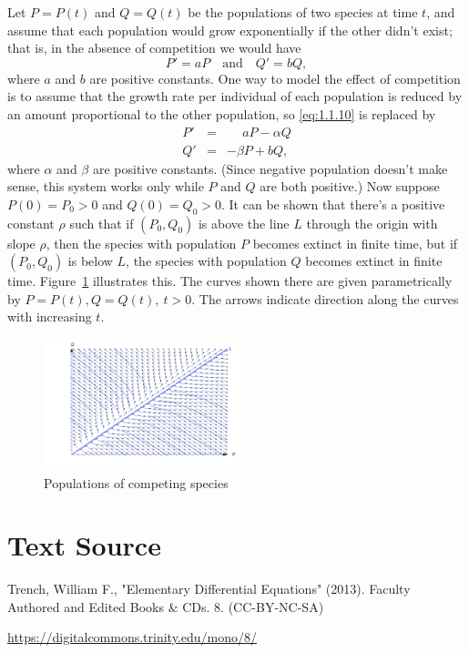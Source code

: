 \documentclass{ximera}
\begin{document}
Let $P=P(t)$ and $Q=Q(t)$ be the populations of two species at time
$t$, and assume that each population would grow exponentially if the
other didn't exist; that is, in the absence of competition we would
have
\begin{equation} \label{eq:1.1.10}
P'=aP \quad\text{and}\quad Q'=bQ,
\end{equation}
where $a$ and $b$ are positive constants. One way to model the effect
of competition is to assume that the growth rate per individual of
each population is reduced by an amount proportional to the other
population, so \eqref{eq:1.1.10} is replaced by
\begin{eqnarray*}
P'&=&\phantom{-}aP-\alpha Q\\
Q'&=&-\beta P+bQ,
\end{eqnarray*}
where $\alpha$ and $\beta$ are positive constants. (Since negative
population doesn't make sense, this system works only while $P$ and
$Q$ are both positive.) Now suppose   $P(0)=P_0>0$ and
$Q(0)=Q_0>0$. It can be shown %
that there's a  positive constant $\rho$ such that if
$(P_0,Q_0)$ is above the line $L$ through the origin with slope $\rho$,
then the species with population $P$ becomes extinct in finite time,
but if $(P_0,Q_0)$ is below $L$,   the species with population
$Q$ becomes extinct in finite time. Figure~\ref{figure:1.1.3} illustrates
this. The curves shown there are given parametrically by $P=P(t),
Q=Q(t),\ t>0$.
 The arrows indicate direction along the curves with
increasing $t$.
\begin{center}
\begin{figure}
  \includegraphics[height=1.5in]{fig010103.jpg}
  \caption{ Populations of competing species}
  \label{figure:1.1.3}
\end{figure}
\end{center}

\section*{Text Source}
Trench, William F., "Elementary Differential Equations" (2013). Faculty Authored and Edited Books \& CDs. 8. (CC-BY-NC-SA)

\href{https://digitalcommons.trinity.edu/mono/8/}{https://digitalcommons.trinity.edu/mono/8/}
\end{document}
